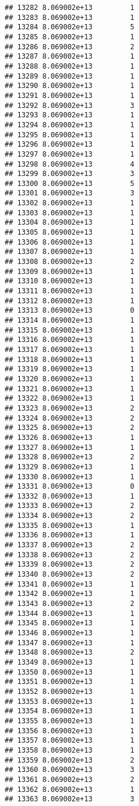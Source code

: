\documentclass[
]{article}
\begin{document}
\begin{verbatim}
## 13282 8.069002e+13         1
## 13283 8.069002e+13         1
## 13284 8.069002e+13         5
## 13285 8.069002e+13         1
## 13286 8.069002e+13         2
## 13287 8.069002e+13         1
## 13288 8.069002e+13         1
## 13289 8.069002e+13         1
## 13290 8.069002e+13         1
## 13291 8.069002e+13         1
## 13292 8.069002e+13         3
## 13293 8.069002e+13         1
## 13294 8.069002e+13         1
## 13295 8.069002e+13         1
## 13296 8.069002e+13         1
## 13297 8.069002e+13         1
## 13298 8.069002e+13         4
## 13299 8.069002e+13         3
## 13300 8.069002e+13         5
## 13301 8.069002e+13         3
## 13302 8.069002e+13         1
## 13303 8.069002e+13         1
## 13304 8.069002e+13         1
## 13305 8.069002e+13         1
## 13306 8.069002e+13         1
## 13307 8.069002e+13         1
## 13308 8.069002e+13         2
## 13309 8.069002e+13         1
## 13310 8.069002e+13         1
## 13311 8.069002e+13         1
## 13312 8.069002e+13         1
## 13313 8.069002e+13         0
## 13314 8.069002e+13         1
## 13315 8.069002e+13         1
## 13316 8.069002e+13         1
## 13317 8.069002e+13         1
## 13318 8.069002e+13         1
## 13319 8.069002e+13         1
## 13320 8.069002e+13         1
## 13321 8.069002e+13         1
## 13322 8.069002e+13         1
## 13323 8.069002e+13         2
## 13324 8.069002e+13         2
## 13325 8.069002e+13         2
## 13326 8.069002e+13         1
## 13327 8.069002e+13         1
## 13328 8.069002e+13         2
## 13329 8.069002e+13         1
## 13330 8.069002e+13         1
## 13331 8.069002e+13         0
## 13332 8.069002e+13         1
## 13333 8.069002e+13         2
## 13334 8.069002e+13         2
## 13335 8.069002e+13         1
## 13336 8.069002e+13         1
## 13337 8.069002e+13         2
## 13338 8.069002e+13         2
## 13339 8.069002e+13         2
## 13340 8.069002e+13         2
## 13341 8.069002e+13         1
## 13342 8.069002e+13         1
## 13343 8.069002e+13         2
## 13344 8.069002e+13         1
## 13345 8.069002e+13         1
## 13346 8.069002e+13         1
## 13347 8.069002e+13         1
## 13348 8.069002e+13         2
## 13349 8.069002e+13         1
## 13350 8.069002e+13         1
## 13351 8.069002e+13         1
## 13352 8.069002e+13         1
## 13353 8.069002e+13         1
## 13354 8.069002e+13         1
## 13355 8.069002e+13         1
## 13356 8.069002e+13         1
## 13357 8.069002e+13         1
## 13358 8.069002e+13         1
## 13359 8.069002e+13         2
## 13360 8.069002e+13         3
## 13361 8.069002e+13         2
## 13362 8.069002e+13         1
## 13363 8.069002e+13         3

\end{verbatim}
\end{document}
